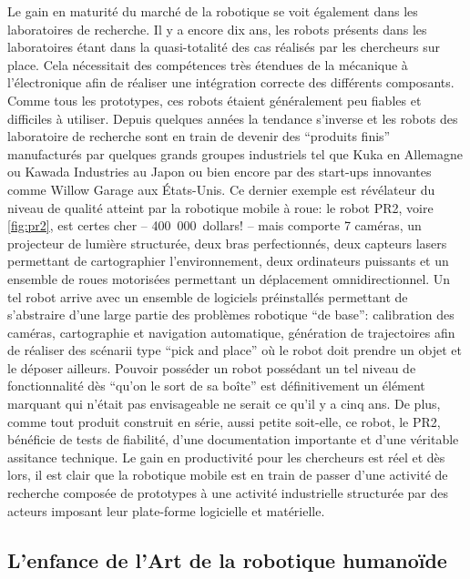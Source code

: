Le gain en maturité du marché de la robotique se voit également dans
les laboratoires de recherche. Il y a encore dix ans, les robots
présents dans les laboratoires étant dans la quasi-totalité des cas
réalisés par les chercheurs sur place. Cela nécessitait des
compétences très étendues de la mécanique à l'électronique afin de
réaliser une intégration correcte des différents composants. Comme
tous les prototypes, ces robots étaient généralement peu fiables et
difficiles à utiliser. Depuis quelques années la tendance s'inverse et
les robots des laboratoire de recherche sont en train de devenir des
``produits finis'' manufacturés par quelques grands groupes
industriels tel que Kuka en Allemagne ou Kawada Industries au Japon ou
bien encore par des start-ups innovantes comme Willow Garage aux
États-Unis. Ce dernier exemple est révélateur du niveau de qualité
atteint par la robotique mobile à roue: le robot PR2, voire
\autoref{fig:pr2}, est certes cher -- 400 000 dollars! -- mais
comporte 7 caméras, un projecteur de lumière structurée, deux bras
perfectionnés, deux capteurs lasers permettant de cartographier
l'environnement, deux ordinateurs puissants et un ensemble de roues
motorisées permettant un déplacement omnidirectionnel. Un tel robot
arrive avec un ensemble de logiciels préinstallés permettant de
s'abstraire d'une large partie des problèmes robotique ``de base'':
calibration des caméras, cartographie et navigation automatique,
génération de trajectoires afin de réaliser des scénarii type ``pick
and place'' où le robot doit prendre un objet et le déposer
ailleurs. Pouvoir posséder un robot possédant un tel niveau de
fonctionnalité dès ``qu'on le sort de sa boîte'' est définitivement un
élément marquant qui n'était pas envisageable ne serait ce qu'il y a
cinq ans. De plus, comme tout produit construit en série, aussi petite
soit-elle, ce robot, le PR2, bénéficie de tests de fiabilité, d'une
documentation importante et d'une véritable assitance technique. Le
gain en productivité pour les chercheurs est réel et dès lors, il est
clair que la robotique mobile est en train de passer d'une activité de
recherche composée de prototypes à une activité industrielle
structurée par des acteurs imposant leur plate-forme logicielle et
matérielle.



\subsection{L'enfance de l'Art de la robotique humanoïde}


